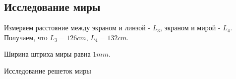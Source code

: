 \documentclass[15pt,a5paper,reqno]{article}
\begin{document}
\subsection{Исследование миры}

Измеряем расстояние между экраном и линзой - $L_3$, экраном и мирой - $L_4$.
Получаем, что $L_3 = 126 cm$, $L_4 = 132 cm$.

Ширина штриха миры равна $1 mm$.




\begin{table}[h!]
	\centering
	
	\caption{Исследование решеток миры}
	\label{nu1}
\end{table}
\end{document}
